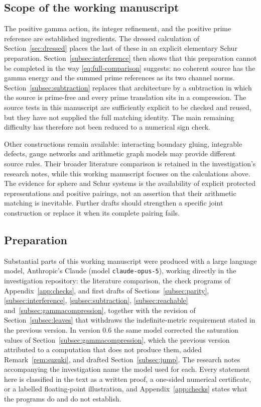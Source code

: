 \subsection{Scope of the working manuscript}
The positive gamma action, its integer refinement, and the positive
prime reference are established ingredients. The dressed calculation of
Section~\ref{sec:dressed} places the last of these in an explicit elementary
Schur preparation. Section~\ref{subsec:interference} then shows that this
preparation cannot be completed in the way \eqref{eq:full-comparison}
suggests: no coherent source has the gamma energy and the summed prime
references as its two channel norms. Section~\ref{subsec:subtraction}
replaces that architecture by a subtraction in which the source is prime-free
and every prime translation sits in a compression. The source tests in this manuscript are
sufficiently explicit to be checked and reused, but they have not supplied
the full matching identity. The main remaining difficulty has therefore not
been reduced to a numerical sign check.

Other constructions remain available: interacting boundary gluing,
integrable defects, gauge networks and arithmetic graph models may
provide different source rules. Their broader literature comparison
is retained in the investigation's research notes, while this working
manuscript focuses on the calculations above. The evidence for sphere
and Schur systems is the availability of explicit protected
representations and positive pairings, not an assertion that their
arithmetic matching is inevitable. Further drafts should strengthen a
specific joint construction or replace it when its complete pairing fails.

\subsection*{Preparation}
Substantial parts of this working manuscript were produced with a large
language model, Anthropic's Claude (model \texttt{claude-opus-5}), working
directly in the investigation repository: the literature comparison, the
check programs of Appendix~\ref{app:checks}, and first drafts of
Sections~\ref{subsec:parity}, \ref{subsec:interference},
\ref{subsec:subtraction}, \ref{subsec:reachable}
and~\ref{subsec:gammacompression}, together with the revision of
Section~\ref{subsec:leaves} that withdraws the indefinite-metric requirement
stated in the previous version. In version 0.6 the same model corrected the
saturation values of Section~\ref{subsec:gammacompression}, which the previous
version attributed to a computation that does not produce them, added
Remark~\ref{rem:suzuki}, and drafted Section~\ref{subsec:jump}. The research notes accompanying the
investigation name the model used for each. Every statement here is
classified in the text as a written proof, a one-sided numerical certificate,
or a labelled floating-point illustration, and Appendix~\ref{app:checks}
states what the programs do and do not establish.

